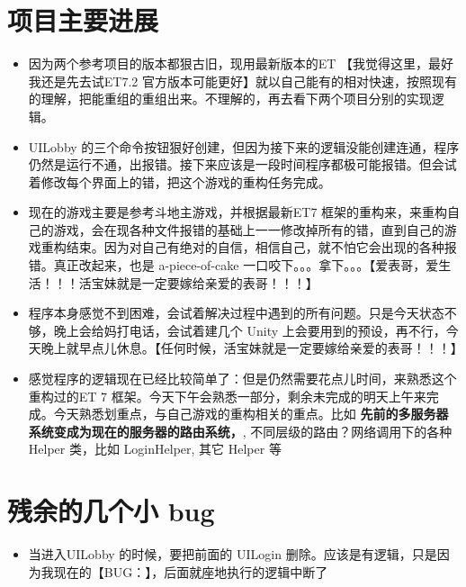 \documentclass[9pt, b5paper]{article}
\begin{document}
\section{项目主要进展}
\label{sec:org82a30e5}
\begin{itemize}
\item 因为两个参考项目的版本都狠古旧，现用最新版本的ET 【我觉得这里，最好我还是先去试ET7.2 官方版本可能更好】就以自己能有的相对快速，按照现有的理解，把能重组的重组出来。不理解的，再去看下两个项目分别的实现逻辑。
\item UILobby 的三个命令按钮狠好创建，但因为接下来的逻辑没能创建连通，程序仍然是运行不通，出报错。接下来应该是一段时间程序都极可能报错。但会试着修改每个界面上的错，把这个游戏的重构任务完成。
\item 现在的游戏主要是参考斗地主游戏，并根据最新ET7 框架的重构来，来重构自己的游戏，会在现各种文件报错的基础上一一修改掉所有的错，直到自己的游戏重构结束。因为对自己有绝对的自信，相信自己，就不怕它会出现的各种报错。真正改起来，也是 a-piece-of-cake 一口咬下。。。拿下。。。【爱表哥，爱生活！！！活宝妹就是一定要嫁给亲爱的表哥！！！】
\item 程序本身感觉不到困难，会试着解决过程中遇到的所有问题。只是今天状态不够，晚上会给妈打电话，会试着建几个 Unity 上会要用到的预设，再不行，今天晚上就早点儿休息。【任何时候，活宝妹就是一定要嫁给亲爱的表哥！！！】
\item 感觉程序的逻辑现在已经比较简单了：但是仍然需要花点儿时间，来熟悉这个重构过的ET 7 框架。今天下午会熟悉一部分，剩余未完成的明天上午来完成。今天熟悉划重点，与自己游戏的重构相关的重点。比如 \textbf{先前的多服务器系统变成为现在的服务器的路由系统，}, 不同层级的路由？网络调用下的各种Helper 类，比如 LoginHelper, 其它 Helper 等
\end{itemize}
\section{残余的几个小 bug}
\label{sec:orgb03e89a}
\begin{itemize}
\item 当进入UILobby 的时候，要把前面的 UILogin 删除。应该是有逻辑，只是因为我现在的【BUG：】，后面就座地执行的逻辑中断了
\end{itemize}
\end{document}
